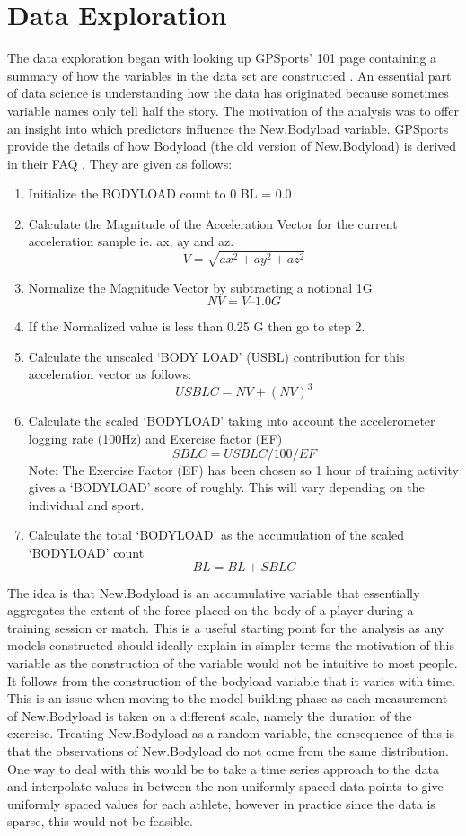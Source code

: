 \section{Data Exploration}
The data exploration began with looking up GPSports' 101 page containing a summary of how the variables in the data set are constructed \cite{GPSportsVariables}. An essential part of data science is understanding how the data has originated because sometimes variable names only tell half the story. The motivation of the analysis was to offer an insight into which predictors influence the New.Bodyload variable. GPSports provide the details of how Bodyload (the old version of New.Bodyload) is derived in their FAQ \cite{NewBodyloadFAQ}. They are given as follows: 
\begin{enumerate}
	\item Initialize the BODYLOAD count to 0
	BL = 0.0
	\item Calculate the Magnitude of the Acceleration Vector for the current acceleration
	sample ie. ax, ay and az.
	\[V =\sqrt{ax^2+ay^2+az^2}\]
	
	\item Normalize the Magnitude Vector by subtracting a notional 1G
	\[NV = V – 1.0 G\]
	\item If the Normalized value is less than 0.25 G then go to step 2.
	\item Calculate the unscaled ‘BODY LOAD’ (USBL) contribution for this acceleration vector as follows:
	\[USBLC = NV + (NV)^3\]
	\item Calculate the scaled ‘BODYLOAD’ taking into account the accelerometer logging rate (100Hz) and Exercise factor (EF)
	\[SBLC = USBLC / 100 / EF\]
	Note: The Exercise Factor (EF) has been chosen so 1 hour of training activity gives a
	‘BODYLOAD’ score of roughly. This will vary depending on the individual and sport.
	\item Calculate the total ‘BODYLOAD’ as the accumulation of the scaled ‘BODYLOAD’ count
	\[BL = BL + SBLC\]
\end{enumerate}
	The idea is that New.Bodyload is an accumulative variable that essentially aggregates the extent of the force placed on the body of a player during a training session or match. This is a useful starting point for the analysis as any models constructed should ideally explain in simpler terms the motivation of this variable as the construction of the variable would not be intuitive to most people. It follows from the construction of the bodyload variable that it varies with time. This is an issue when moving to the model building phase as each measurement of New.Bodyload is taken on a different scale, namely the duration of the exercise. Treating New.Bodyload as a random variable, the consequence of this is that the observations of New.Bodyload do not come from the same distribution. One way to deal with this would be to take a time series approach to the data and interpolate values in between the non-uniformly spaced data points to give uniformly spaced values for each athlete, however in practice since the data is sparse, this would not be feasible. 

